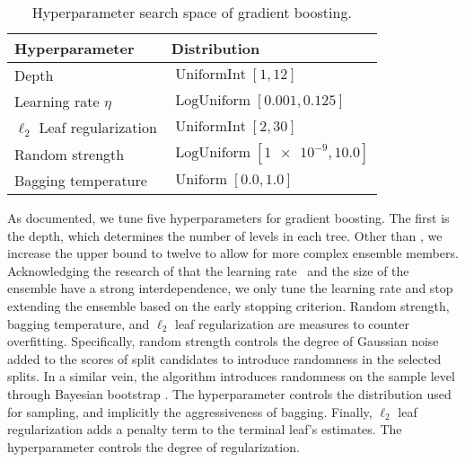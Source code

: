 \begin{table}[!h]
    \centering
    \caption[Hyperparameter Search Space of Gradient Boosting]{Hyperparameter search space of gradient boosting.}
    \label{tab:hyperparameter-space-gbm}
    \begin{tabular}{@{}ll@{}}
        \toprule
        Hyperparameter               & Distribution                                  \\ \midrule
        Depth                        & $\operatorname{UniformInt}[1,12]$             \\
        Learning rate $\eta$         & $\operatorname{LogUniform}[0.001, 0.125]$     \\
        $\ell_2$ Leaf regularization & $\operatorname{UniformInt}[2, 30]$            \\
        Random strength              & $\operatorname{LogUniform}[\num{1e-9}, 10.0]$ \\
        Bagging temperature          & $\operatorname{Uniform}[0.0, 1.0]$            \\ \bottomrule
    \end{tabular}
\end{table}

As documented, we tune five hyperparameters for gradient boosting. The first is the depth, which determines the number of levels in each tree. Other than \textcite[\checkmark][18952]{gorishniyRevisitingDeepLearning2021}, we increase the upper bound to twelve to allow for more complex ensemble members. Acknowledging the research of \textcite[\checkmark][1203]{friedmanGreedyFunctionApproximation2001} that the learning rate \eta~and the size of the ensemble have a strong interdependence, we only tune the learning rate and stop extending the ensemble based on the early stopping criterion. Random strength, bagging temperature, and $\ell_2$ leaf regularization are measures to counter overfitting. Specifically, random strength controls the degree of Gaussian noise added to the scores of split candidates to introduce randomness in the selected splits. In a similar vein, the algorithm introduces randomness on the sample level through Bayesian bootstrap \autocite[\checkmark][130--131]{rubinBayesianBootstrap1981}. The hyperparameter controls the distribution used for sampling, and implicitly the aggressiveness of bagging. Finally, $\ell_2$ leaf regularization adds a penalty term to the terminal leaf's estimates. The hyperparameter controls the degree of regularization.

